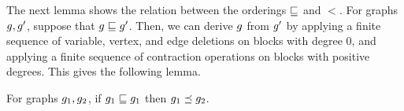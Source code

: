 The next lemma shows the relation between the orderings $\sqsubseteq$  and
$\lt$.
%
For graphs $g,g'$,
suppose that $g\sqsubseteq g'$.
%
Then, we can derive $g$ from $g'$ by
applying a finite sequence of variable, vertex, and edge deletions
on blocks with degree $0$, and
applying a finite sequence of contraction
operations on blocks with positive degrees.
%
%
This gives the following lemma.
%
\begin{lemma}
\label{encoding:implication:lemma}
For graphs $g_1,g_2$, if 
$g_1\sqsubseteq g_1$ then
$g_1\preceq g_2$.
\end{lemma}

